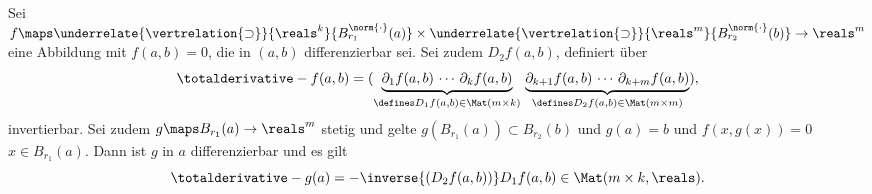 \begin{satz}\label{funktion_ableiten_mit_hoeheren_abbildungen}
  Sei \( f\maps \underrelate{\vertrelation{\supset}}{\reals^k}{B_{r_1}^{\norm{\cdot}}(a)}\times \underrelate{\vertrelation{\supset}}{\reals^m}{B_{r_2}^{\norm{\cdot}}(b)}\to \reals^m \) eine Abbildung mit \( f(a,b)=0 \), die in \( (a,b) \) differenzierbar sei. Sei zudem \( D_2 f(a,b) \), definiert über
  \begin{equation*}
    \totalderivative-{f}(a,b)=(\underbrace{\partial_1 f(a,b)\, \cdots\,  \partial_k f(a,b)}_{\defines D_1 f(a,b)\in \Mat(m\times k)}\, \underbrace{\partial_{k+1}f(a,b)\, \cdots\, \partial_{k+m}f(a,b)}_{\defines D_2 f(a,b)\in \Mat(m\times m)}),
  \end{equation*}
  invertierbar. Sei zudem \( g\maps B_{r_1}(a)\to \reals^m \) stetig und gelte \( g(B_{r_1}(a))\subset B_{r_2}(b) \) und \( g(a)=b \) und \( f(x,g(x))=0 \) \tforall \( x\in B_{r_1}(a) \). Dann ist \( g \) in \( a \) differenzierbar und es gilt
  \begin{equation*}
    \totalderivative-{g}(a)=-\inverse{\left( D_2f(a,b) \right)}D_1 f(a,b)\in \Mat(m\times k, \reals).
  \end{equation*}
\end{satz}
